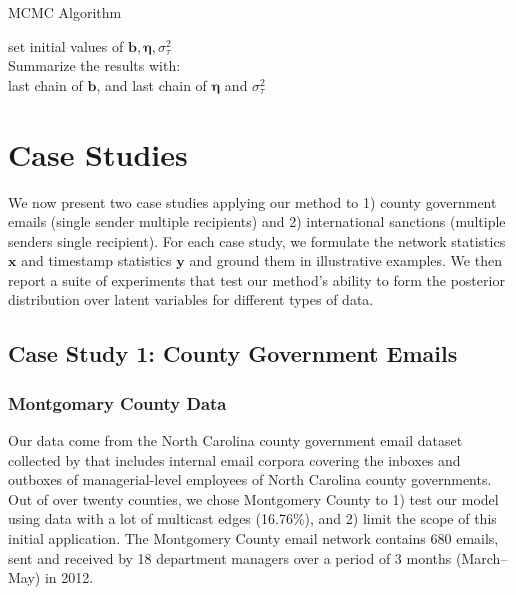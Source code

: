 \documentclass[12pt]{article}
\begin{document}
 \begin{algorithm}[H]
 	\SetAlgoLined
 	\caption{MCMC Algorithm}
 	set initial values of $\boldsymbol{b}, \boldsymbol{\eta}, \sigma_\tau^2$\\
 	Summarize the results with: \\last chain of $\boldsymbol{b}$, and last chain of $\boldsymbol{\eta}$ and $\sigma_\tau^2$ 
 				\label{alg:MCMC}
 \end{algorithm}
\section{Case Studies}\label{sec:case studies}
We now present two case studies applying our method to 1) county government emails (single sender multiple recipients) and 2) international sanctions (multiple senders single recipient). For each case study,
we formulate the network statistics $\boldsymbol{x}$ and timestamp statistics $\boldsymbol{y}$ and ground them in
illustrative examples. We then report a suite of experiments that test our method’s ability to form the posterior distribution over latent variables for different types of data. 
 	   \subsection{Case Study 1: County Government Emails}\label{subsec:Emails}
 	  	   \subsubsection{Montgomary County Data}\label{subsubsec:Montgomery}
 	   Our data come from the North Carolina county government email dataset collected by \cite{ben2017transparency} that includes internal email corpora covering the inboxes and outboxes of managerial-level employees of North Carolina county governments. Out of over twenty counties, we chose Montgomery County to 1) test our model using data with a lot of multicast edges (16.76\%), and 2) limit the scope of this initial application. The Montgomery County email network contains 680 emails, sent and received by 18 department managers over a period of 3 months (March--May) in 2012. 
\end{document}
